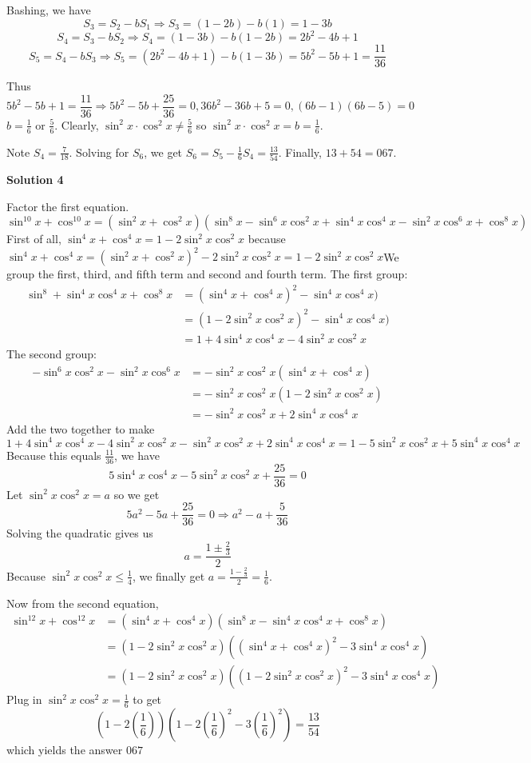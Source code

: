 \begin{enumerate}
 Bashing, we have
 \[S_3=S_2-bS_1\Rightarrow S_3=(1-2b)-b(1)=1-3b\]
 \[S_4=S_3-bS_2\Rightarrow S_4=(1-3b)-b(1-2b)=2b^2-4b+1\]
 \[S_5=S_4-bS_3\Rightarrow S_5=(2b^2-4b+1)-b(1-3b)=5b^2-5b+1=\frac{11}{36}\]

 Thus 
 \[5b^2-5b+1=\frac{11}{36}\Rightarrow 5b^2-5b+\frac{25}{36}=0, 36b^2-36b+5=0, (6b-1)(6b-5)=0\]$b=\frac{1}{6} \text{ or } \frac{5}{6}$. Clearly, $\sin^2x\cdot\cos^2x\not=\frac{5}{6}$ so $\sin^2x\cdot\cos^2x=b=\frac{1}{6}$.

 Note $S_4=\frac{7}{18}$. Solving for $S_6$, we get $S_6=S_5-\frac{1}{6}S_4=\frac{13}{54}$. Finally, $13+54=\boxed{067}$.

 



\textbf{Solution 4}

Factor the first equation. 
 \[\sin^{10}x + \cos^{10}x = (\sin^2x+\cos^2x)(\sin^8x-\sin^6x\cos^2x+\sin^4x\cos^4x-\sin^2x\cos^6x+\cos^8x)\]First of all, $\sin^4x+\cos^4x = 1-2\sin^2x\cos^2x$ because $\sin^4x+\cos^4x=(\sin^2x + \cos^2x)^2 -2\sin^2x\cos^2x = 1 - 2\sin^2x\cos^2x$We group the first, third, and fifth term and second and fourth term. The first group: 
 \begin{align*} \sin^8+\sin^4x\cos^4x+\cos^8x &= (\sin^4x+\cos^4x)^2-\sin^4x\cos^4x)\\ &= (1 - 2\sin^2x\cos^2x)^2-\sin^4x\cos^4x)\\ &= 1+4\sin^4x\cos^4x-4\sin^2x\cos^2x \end{align*}
The second group: 
 \begin{align*} -\sin^6x\cos^2x-\sin^2x\cos^6x  &= -\sin^2x\cos^2x(\sin^4x+\cos^4x)\\ &= -\sin^2x\cos^2x(1-2\sin^2x\cos^2x)\\ &= -\sin^2x\cos^2x+2\sin^4x\cos^4x \end{align*}
Add the two together to make 
 \[1+4\sin^4x\cos^4x-4\sin^2x\cos^2x-\sin^2x\cos^2x+2\sin^4x\cos^4x = 1 - 5\sin^2x\cos^2x+5\sin^4x\cos^4x\] Because this equals $\frac{11}{36}$, we have 
 \[5\sin^4x\cos^4x- 5\sin^2x\cos^2x+\frac{25}{36}=0\] Let $\sin^2x\cos^2x = a$ so we get 
 \[5a^2- 5a+\frac{25}{36}=0 \Rightarrow a^2-a+\frac{5}{36}\] Solving the quadratic gives us 
 \[a = \frac{1 \pm \frac{2}{3}}{2}\] Because $\sin^2x\cos^2x \le \frac{1}{4}$, we finally get $a = \frac{1 - \frac{2}{3}}{2} = \frac{1}{6}$. 

 Now from the second equation, 
 \begin{align*} \sin^{12}x + \cos^{12}x &= (\sin^4x+\cos^4x)(\sin^8x-\sin^4x\cos^4x+\cos^8x)\\ &= (1-2\sin^2x\cos^2x)((\sin^4x+\cos^4x)^2-3\sin^4x\cos^4x)\\ &= (1-2\sin^2x\cos^2x)((1-2\sin^2x\cos^2x)^2-3\sin^4x\cos^4x) \end{align*}
Plug in $\sin^2x\cos^2x = \frac{1}{6}$ to get 
 \[(1-2(\frac{1}{6}))(1-2(\frac{1}{6})^2-3(\frac{1}{6})^2) = \frac{13}{54}\]which yields the answer $\boxed{067}$





\end{enumerate}
